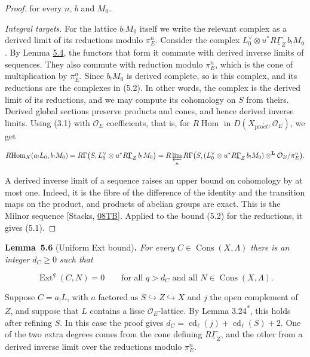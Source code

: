 \documentclass[11pt]{article}
\newenvironment{bpstatement}[2]{\par\addvspace{0.6\baselineskip}\noindent\textbf{#1}#2\textbf{.}\enspace\ignorespaces}
  {\par\addvspace{0.4\baselineskip}}
\newenvironment{bpstatementit}[2]{\begin{bpstatement}{#1}{#2}\itshape\ignorespaces}{\end{bpstatement}}
\newcommand{\bpout}[1]{#1\textsuperscript{\hyperlink{bp-outside}{\ensuremath{\ast}}}}
\providecommand{\Cons}{}\renewcommand{\Cons}{\operatorname{Cons}}
\providecommand{\Ext}{}\renewcommand{\Ext}{\operatorname{Ext}}
\begin{document}
\begin{proof}[{Proof}]
for every \(n\), \(b\) and \(M_0\).

\emph{Integral targets.} For the lattice \(b_!M_0\) itself we write the relevant complex as a derived limit of its reductions modulo \(\pi_E^n\). Consider the complex \(L_0^\vee\otimes u^*R\underline\Gamma_Z\,b_!M_0\). By Lemma \hyperref[bp15]{5.4}, the functors that form it commute with derived inverse limits of sequences. They also commute with reduction modulo \(\pi_E^n\), which is the cone of multiplication by \(\pi_E^n\). Since \(b_!M_0\) is derived complete, so is this complex, and its reductions are the complexes in (5.2). In other words, the complex is the derived limit of its reductions, and we may compute its cohomology on \(S\) from theirs. Derived global sections preserve products and cones, and hence derived inverse limits. Using (3.1) with \(\mathcal O_E\) coefficients, that is, for \(R\!\operatorname{Hom}\) in \(D(X_{\mathrm{pro}\acute{e}t},\mathcal O_E)\), we get

\[
R\!\operatorname{Hom}_X(a_!L_0,b_!M_0)
=R\Gamma\bigl(S,L_0^\vee\otimes u^*R\underline\Gamma_Z\,b_!M_0\bigr)
=R\varprojlim_n R\Gamma\bigl(S,(L_0^\vee\otimes u^*R\underline\Gamma_Z\,b_!M_0)\otimes^{\mathbf L}\mathcal O_E/\pi_E^n\bigr).
\]

A derived inverse limit of a sequence raises an upper bound on cohomology by at most one. Indeed, it is the fibre of the difference of the identity and the transition maps on the product, and products of abelian groups are exact. This is the Milnor sequence [Stacks, \href{https://stacks.math.columbia.edu/tag/08TB}{08TB}]. Applied to the bound (5.2) for the reductions, it gives (5.1).
\end{proof}

\label{bp20}%
\begin{bpstatementit}{Lemma~5.6}{ (Uniform Ext bound)}
For every \(C\in\Cons(X,\Lambda)\) there is an integer \(d_C\geq0\) such that

\[
\Ext^q(C,N)=0
\qquad\text{for all }q>d_C\text{ and all }N\in\Cons(X,\Lambda).
\]
\end{bpstatementit}

\label{bp21}%
Suppose \(C=a_!L\), with \(a\) factored as \(S\hookrightarrow Z\hookrightarrow X\) and \(j\) the open complement of \(Z\), and suppose that \(L\) contains a lisse \(\mathcal O_E\)-lattice. By Lemma \bpout{3.24}, this holds after refining \(S\). In this case the proof gives \(d_C=\operatorname{cd}_\ell(j)+\operatorname{cd}_\ell(S)+2\). One of the two extra degrees comes from the cone defining \(R\underline\Gamma_Z\), and the other from a derived inverse limit over the reductions modulo \(\pi_E^n\).
\end{document}
